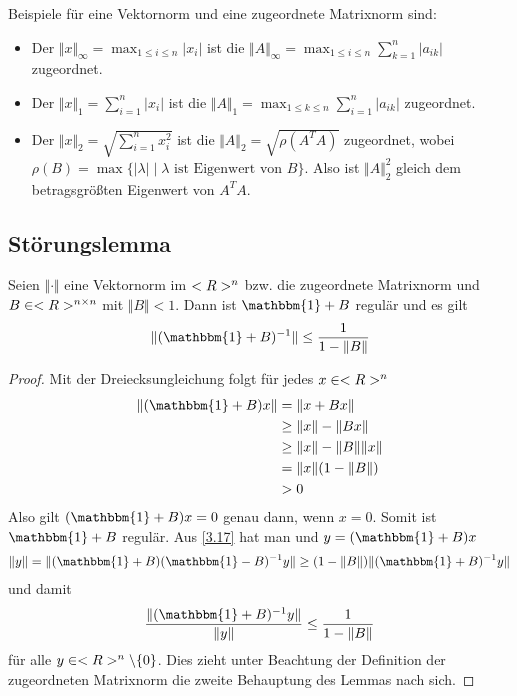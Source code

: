 Beispiele für eine Vektornorm und eine zugeordnete Matrixnorm sind:
\begin{itemize}
	\item Der  $\Vert x\Vert_\infty = \max_{1\le i\le n} \vert x_i\vert$ ist die  $\Vert A\Vert_\infty = \max_{1\le i\le n}\sum_{k=1}^{n}\vert a_{ik}\vert$ zugeordnet.
	\item Der  $\Vert x\Vert_1=\sum_{i=1}^n \vert x_i\vert$ ist die  $\Vert A\Vert_1 = \max_{1\le k\le n}\sum_{i=1}^n \vert a_{ik}\vert$ zugeordnet.
	\item Der  $\Vert x\Vert_2 = \sqrt{\sum_{i=1}^n x_i^2}$ ist die  $\Vert A\Vert_2 = \sqrt{\rho(A^TA)}$ zugeordnet, wobei $\rho(B)=\max\{\vert \lambda\vert\mid \lambda \text{ ist Eigenwert von } B\}$. Also ist $\Vert A\Vert_2^2$ gleich dem betragsgrößten Eigenwert von $A^TA$.
\end{itemize}

\subsection{Störungslemma}

\begin{lemma}
	Seien $\Vert\cdot\Vert$ eine Vektornorm im $<R>^n$ bzw. die zugeordnete Matrixnorm und $B\in<R>^{n\times n}$ mit $\Vert B\Vert<1$. Dann ist $\mathbbm{1}+B$ regulär und es gilt
	\begin{align}
		\Vert (\mathbbm{1}+B)^{-1}\Vert \le \frac{1}{1-\Vert B\Vert}\notag
	\end{align}
\end{lemma}
\begin{proof}
	Mit der Dreiecksungleichung folgt für jedes $x\in<R>^n$
	\begin{align}
		\label{3.17}
		\begin{split}
			\Vert (\mathbbm{1}+B)x\Vert &= \Vert x+Bx\Vert \\
			&\ge \Vert x\Vert - \Vert Bx\Vert \\
			&\ge \Vert x\Vert - \Vert B\Vert\Vert x\Vert \\
			&= \Vert x\Vert (1-\Vert B\Vert) \\
			&> 0
		\end{split}
	\end{align}
	Also gilt $(\mathbbm{1}+B)x=0$ genau dann, wenn $x=0$. Somit ist $\mathbbm{1}+B$ regulär. Aus \cref{3.17} hat man und $y=(\mathbbm{1}+B)x$
	\begin{align}
		\Vert y\Vert = \Vert (\mathbbm{1}+B)(\mathbbm{1}-B)^{-1}y\Vert \ge (1-\Vert B\Vert)\Vert (\mathbbm{1}+B)^{-1}y\Vert \notag
	\end{align}
	und damit
	\begin{align}
		\frac{\Vert (\mathbbm{1}+B)^{-1}y\Vert}{\Vert y\Vert} \le \frac{1}{1-\Vert B\Vert}\notag
	\end{align}
	für alle $y\in<R>^n\backslash\{0\}$. Dies zieht unter Beachtung der Definition der zugeordneten Matrixnorm die zweite Behauptung des Lemmas nach sich.
\end{proof}


